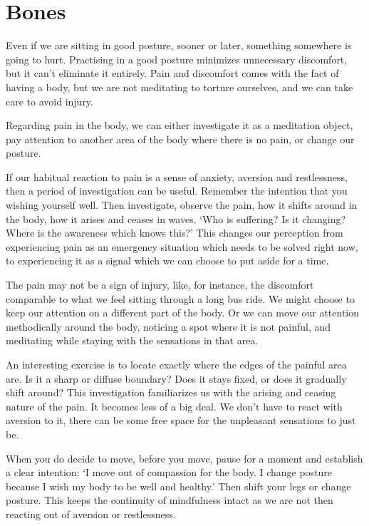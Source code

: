 \chapter{Bones}


\noindent Even if we are sitting in good posture, sooner or later,
something somewhere is going to hurt. Practising in a good posture
minimizes unnecessary discomfort, but it can't eliminate it entirely.
Pain and discomfort comes with the fact of having a body, but we are not
meditating to torture ourselves, and we can take care to avoid injury.

Regarding pain in the body, we can either investigate it as a meditation
object, pay attention to another area of the body where there is no
pain, or change our posture.

If our habitual reaction to pain is a sense of anxiety, aversion and
restlessness, then a period of investigation can be useful. Remember the
intention that you wishing yourself well. Then investigate, observe the
pain, how it shifts around in the body, how it arises and ceases in
waves. `Who is suffering? Is it changing? Where is the awareness which
knows this?' This changes our perception from experiencing pain as an
emergency situation which needs to be solved right now, to experiencing
it as a signal which we can choose to put aside for a time.

\enlargethispage*{\baselineskip}

The pain may not be a sign of injury, like, for instance, the discomfort
comparable to what we feel sitting through a long bus ride. We might
choose to keep our attention on a different part of the body. Or we can
move our attention methodically around the body, noticing a spot where
it is not painful, and meditating while staying with the sensations in
that area.

An interesting exercise is to locate exactly where the edges of the
painful area are. Is it a sharp or diffuse boundary? Does it stays
fixed, or does it gradually shift around? This investigation
familiarizes us with the arising and ceasing nature of the pain. It
becomes less of a big deal. We don't have to react with aversion to it,
there can be some free space for the unpleasant sensations to just be.

When you do decide to move, before you move, pause for a moment and
establish a clear intention: `I move out of compassion for the body. I
change posture because I wish my body to be well and healthy.' Then
shift your legs or change posture. This keeps the continuity of
mindfulness intact as we are not then reacting out of aversion or
restlessness.

